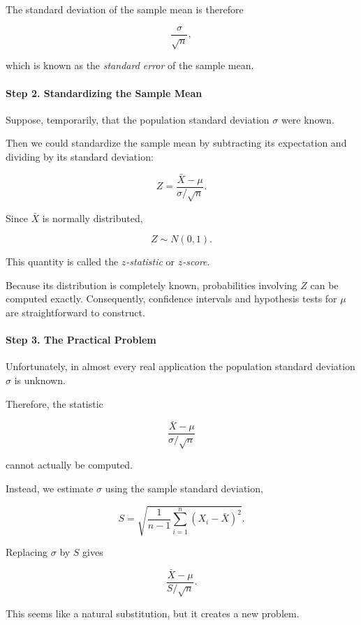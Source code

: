 \documentclass[11pt]{article}
\begin{document}
\begin{mdframed}[
		linewidth=0.8pt,
		roundcorner=6pt,
		backgroundcolor=gray!5,
		linecolor=gray!60,
		innertopmargin=10pt,
		innerbottommargin=10pt,
		innerleftmargin=10pt,
		innerrightmargin=10pt
		]
		The standard deviation of the sample mean is therefore
		
		\[
		\frac{\sigma}{\sqrt n},
		\]
		
		which is known as the \emph{standard error} of the sample mean.
		
		\paragraph{Step 2. Standardizing the Sample Mean}
		
		Suppose, temporarily, that the population standard deviation $\sigma$ were
		known.
		
		Then we could standardize the sample mean by subtracting its expectation
		and dividing by its standard deviation:
		
		\[
		Z
		=
		\frac{\bar X-\mu}
		{\sigma/\sqrt n}.
		\]
		
		Since $\bar X$ is normally distributed,
		
		\[
		Z\sim N(0,1).
		\]
		
		This quantity is called the \emph{$z$-statistic} or \emph{$z$-score}.
		
		Because its distribution is completely known, probabilities involving $Z$
		can be computed exactly. Consequently, confidence intervals and hypothesis
		tests for $\mu$ are straightforward to construct.
		
		\paragraph{Step 3. The Practical Problem}
		
		Unfortunately, in almost every real application the population standard
		deviation $\sigma$ is unknown.
		
		Therefore, the statistic
		
		\[
		\frac{\bar X-\mu}
		{\sigma/\sqrt n}
		\]
		
		cannot actually be computed.
		
		Instead, we estimate $\sigma$ using the sample standard deviation,
		
		\[
		S
		=
		\sqrt{
			\frac1{n-1}
			\sum_{i=1}^{n}
			(X_i-\bar X)^2
		}.
		\]
		
		Replacing $\sigma$ by $S$ gives
		
		\[
		\frac{\bar X-\mu}
		{S/\sqrt n}.
		\]
		
		This seems like a natural substitution, but it creates a new problem.
		

\end{mdframed}
\end{document}
